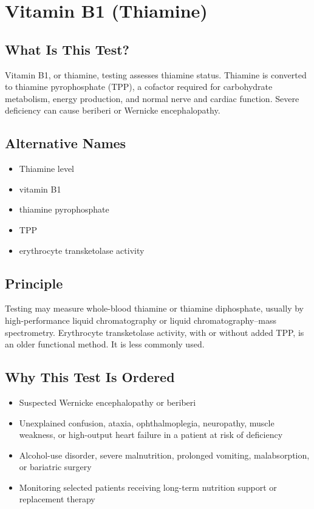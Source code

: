 \chapter{Vitamin B1 (Thiamine)}

\section*{What Is This Test?}
Vitamin B1, or thiamine, testing assesses thiamine status. Thiamine is converted to thiamine pyrophosphate (TPP), a cofactor required for carbohydrate metabolism, energy production, and normal nerve and cardiac function. Severe deficiency can cause beriberi or Wernicke encephalopathy.

\section*{Alternative Names}
\begin{itemize}
  \item Thiamine level
  \item vitamin B1
  \item thiamine pyrophosphate
  \item TPP
  \item erythrocyte transketolase activity
\end{itemize}
\section*{Principle}
Testing may measure whole-blood thiamine or thiamine diphosphate, usually by high-performance liquid chromatography or liquid chromatography--mass spectrometry. Erythrocyte transketolase activity, with or without added TPP, is an older functional method. It is less commonly used.

\section*{Why This Test Is Ordered}
\begin{itemize}
  \item Suspected Wernicke encephalopathy or beriberi
  \item Unexplained confusion, ataxia, ophthalmoplegia, neuropathy, muscle weakness, or high-output heart failure in a patient at risk of deficiency
  \item Alcohol-use disorder, severe malnutrition, prolonged vomiting, malabsorption, or bariatric surgery
  \item Monitoring selected patients receiving long-term nutrition support or replacement therapy
\end{itemize}

